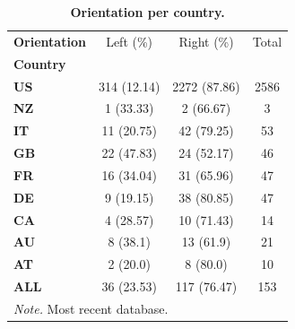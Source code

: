 \begin{table}[H]
\centering
\caption{\textbf{Orientation per country.}}
\label{table:table2}
\begin{tabularx}{\textwidth}{ X c c c}
\toprule
\textbf{Orientation} &     Left (\%) &     Right (\%) &  Total \\
\textbf{Country} &              &               &        \\
\midrule
\textbf{US     } &  314 (12.14) &  2272 (87.86) &   2586 \\
\textbf{NZ     } &    1 (33.33) &     2 (66.67) &      3 \\
\textbf{IT     } &   11 (20.75) &    42 (79.25) &     53 \\
\textbf{GB     } &   22 (47.83) &    24 (52.17) &     46 \\
\textbf{FR     } &   16 (34.04) &    31 (65.96) &     47 \\
\textbf{DE     } &    9 (19.15) &    38 (80.85) &     47 \\
\textbf{CA     } &    4 (28.57) &    10 (71.43) &     14 \\
\textbf{AU     } &     8 (38.1) &     13 (61.9) &     21 \\
\textbf{AT     } &     2 (20.0) &      8 (80.0) &     10 \\
\textbf{ALL    } &   36 (23.53) &   117 (76.47) &    153 \\
\bottomrule
\multicolumn{5}{l}{\textit{Note.} Most recent database.}
\end{tabularx}
\end{table}
